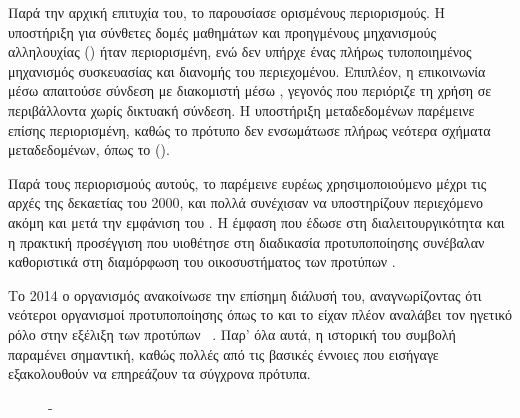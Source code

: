 Παρά την αρχική επιτυχία του, το  παρουσίασε ορισμένους περιορισμούς. Η υποστήριξη για σύνθετες δομές μαθημάτων και προηγμένους μηχανισμούς αλληλουχίας (\textit{}) ήταν περιορισμένη, ενώ δεν υπήρχε ένας πλήρως τυποποιημένος μηχανισμός συσκευασίας και διανομής του περιεχομένου. Επιπλέον, η επικοινωνία μέσω  απαιτούσε σύνδεση με διακομιστή μέσω , γεγονός που περιόριζε τη χρήση σε περιβάλλοντα χωρίς δικτυακή σύνδεση. Η υποστήριξη μεταδεδομένων παρέμεινε επίσης περιορισμένη, καθώς το πρότυπο δεν ενσωμάτωσε πλήρως νεότερα σχήματα μεταδεδομένων, όπως το     ().

Παρά τους περιορισμούς αυτούς, το  παρέμεινε ευρέως χρησιμοποιούμενο μέχρι τις αρχές της δεκαετίας του 2000, και πολλά  συνέχισαν να υποστηρίζουν  περιεχόμενο ακόμη και μετά την εμφάνιση του . Η έμφαση που έδωσε στη διαλειτουργικότητα και η πρακτική προσέγγιση που υιοθέτησε στη διαδικασία προτυποποίησης συνέβαλαν καθοριστικά στη διαμόρφωση του οικοσυστήματος των προτύπων .

Το 2014 ο οργανισμός  ανακοίνωσε την επίσημη διάλυσή του, αναγνωρίζοντας ότι νεότεροι οργανισμοί προτυποποίησης όπως το  και το   είχαν πλέον αναλάβει τον ηγετικό ρόλο στην εξέλιξη των προτύπων ~\cite{opigno2024standards}. Παρ' όλα αυτά, η ιστορική του συμβολή παραμένει σημαντική, καθώς πολλές από τις βασικές έννοιες που εισήγαγε εξακολουθούν να επηρεάζουν τα σύγχρονα πρότυπα.

\begin{figure}[H]
  \centering
  
  \caption{   -   }
  \label{fig:aicc_hacp}
\end{figure}


